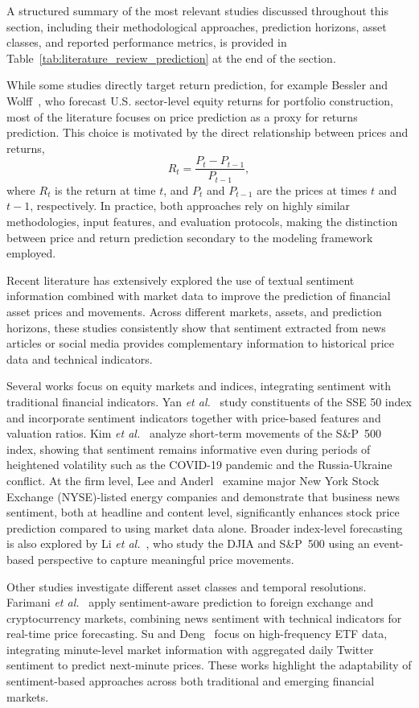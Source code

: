 A structured summary of the most relevant studies discussed throughout this section, including their methodological approaches, prediction horizons, asset classes, and reported performance metrics, is provided in Table~\ref{tab:literature_review_prediction} at the end of the section.

While some studies directly target return prediction, for example Bessler and Wolff~\cite{83780}, who forecast U.S. sector-level equity returns for portfolio construction, most of the literature focuses on price prediction as a proxy for returns prediction. This choice is motivated by the direct relationship between prices and returns,
\[
R_t = \frac{P_t - P_{t-1}}{P_{t-1}},
\]
where $R_t$ is the return at time $t$, and $P_t$ and $P_{t-1}$ are the prices at times $t$ and $t-1$, respectively. In practice, both approaches rely on highly similar methodologies, input features, and evaluation protocols, making the distinction between price and return prediction secondary to the modeling framework employed.

Recent literature has extensively explored the use of textual sentiment information combined with market data to improve the prediction of financial asset prices and movements. Across different markets, assets, and prediction horizons, these studies consistently show that sentiment extracted from news articles or social media provides complementary information to historical price data and technical indicators.

Several works focus on equity markets and indices, integrating sentiment with traditional financial indicators. Yan \emph{et al.}~\cite{9c443} study constituents of the SSE 50 index and incorporate sentiment indicators together with price-based features and valuation ratios. Kim \emph{et al.}~\cite{339f6} analyze short-term movements of the S\&P~500 index, showing that sentiment remains informative even during periods of heightened volatility such as the COVID-19 pandemic and the Russia-Ukraine conflict. At the firm level, Lee and Anderl~\cite{93d76} examine major New York Stock Exchange (NYSE)-listed energy companies and demonstrate that business news sentiment, both at headline and content level, significantly enhances stock price prediction compared to using market data alone. Broader index-level forecasting is also explored by Li \emph{et al.}~\cite{de270}, who study the DJIA and S\&P~500 using an event-based perspective to capture meaningful price movements.

Other studies investigate different asset classes and temporal resolutions. Farimani \emph{et al.}~\cite{a2e88} apply sentiment-aware prediction to foreign exchange and cryptocurrency markets, combining news sentiment with technical indicators for real-time price forecasting. Su and Deng~\cite{34309} focus on high-frequency ETF data, integrating minute-level market information with aggregated daily Twitter sentiment to predict next-minute prices. These works highlight the adaptability of sentiment-based approaches across both traditional and emerging financial markets.

